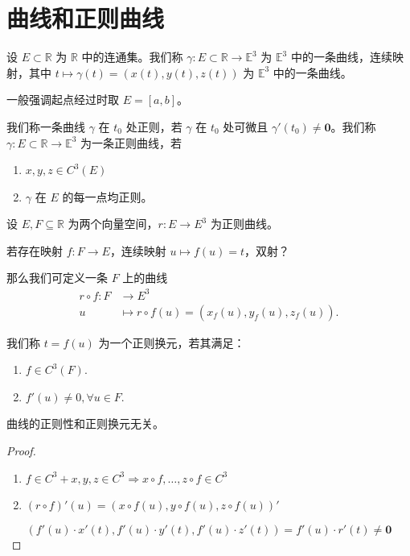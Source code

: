 \documentclass[lang=cn,10pt,thmcnt=section]{elegantbook}
\renewcommand{\vec}[1]{\mathbf{#1}}
\begin{document}
\section{曲线和正则曲线}
\begin{definition}[曲线]
    设 $E \subset \mathbb{R}$ 为 $\mathbb{R}$ 中的连通集。我们称 $\gamma: E \subset \mathbb{R} \rightarrow \mathbb{E}^3$ 为 $\mathbb{E}^3$ 中的一条曲线，连续映射，其中 $t \mapsto \gamma(t) = (x(t), y(t), z(t))$ 为 $\mathbb{E}^3$ 中的一条曲线。
\end{definition}
\begin{remark}
    一般强调起点经过时取 $E = [a, b]$。
\end{remark}
\begin{definition}[正则曲线]
    我们称一条曲线 $\gamma$ 在 $t_0$ 处正则，若 $\gamma$ 在 $t_0$ 处可微且 $\gamma'(t_0) \neq \vec{0}$。我们称 $\gamma: E \subset \mathbb{R} \rightarrow \mathbb{E}^3$ 为一条正则曲线，若
    \begin{enumerate}
        \item $x, y, z \in C^3(E)$
        \item $\gamma$ 在 $E$ 的每一点均正则。
    \end{enumerate}
\end{definition}
\begin{theorem}
    设 $E, F \subseteq \mathbb{R}$ 为两个向量空间，$r: E \rightarrow E^3$ 为正则曲线。
    
    若存在映射 $f: F \rightarrow E$，连续映射 $u \mapsto f(u) = t$，双射？
    
    那么我们可定义一条 $F$ 上的曲线
\begin{align*}
r \circ f: F &\longrightarrow E^3 \\
u &\longmapsto r \circ f(u) = (x_f(u), y_f(u), z_f(u)).
\end{align*}
\end{theorem}
我们称 $t = f(u)$ 为一个正则换元，若其满足：
\begin{enumerate}
    \item $f \in C^3(F)$.
    \item $f'(u) \neq 0, \forall u \in F$.
\end{enumerate}

\begin{theorem}\label{thm:regular_parameter}
曲线的正则性和正则换元无关。
\end{theorem}
\begin{proof}
    \begin{enumerate}
        \item $f \in C^3 + x, y, z \in C^3 \Rightarrow x \circ f, \ldots, z \circ f \in C^3$
        \item $ (r \circ f)'(u) = (x \circ f(u), y \circ f(u), z \circ f(u))' $
    \end{enumerate}
    
    \[
    (f'(u) \cdot x'(t), f'(u) \cdot y'(t), f'(u) \cdot z'(t)) = f'(u) \cdot r'(t) \neq \vec{0}
    \]
\end{proof}
\end{document}

